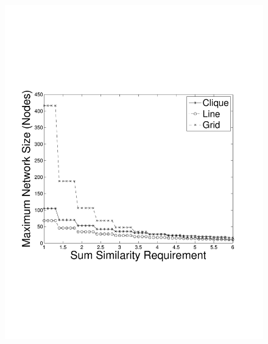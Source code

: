 \begin{figure}
{	\includegraphics[scale=0.22, clip=true, trim=14mm 65mm 25mm 65mm]{num_nodes_vs_sum_sim_10_T_12_IS.pdf}
        \label{fig:use_case_num_nodes_vs_qoi}
        }
  \subfigure[Max Network Size vs. Timeliness (Sum Sim. = 5.0)]{
}
\end{figure}
